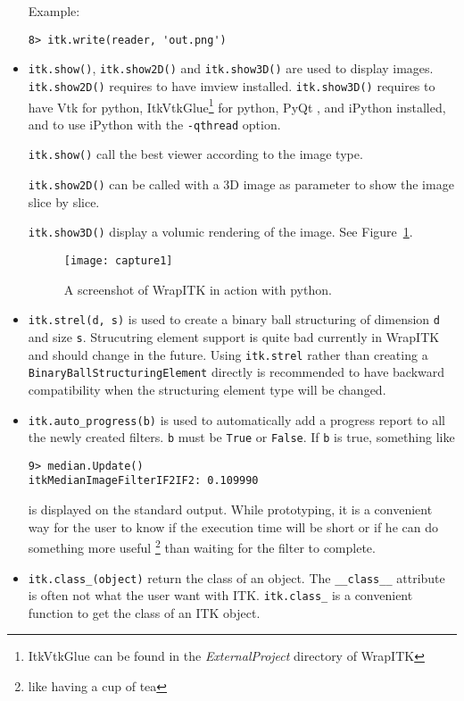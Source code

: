\documentclass{InsightArticle}
\begin{document}
\begin{itemize}
Example:
\begin{verbatim}
8> itk.write(reader, 'out.png')
\end{verbatim}

  \item \verb$itk.show()$, \verb$itk.show2D()$ and \verb$itk.show3D()$ are used to
display images. \verb$itk.show2D()$ requires to have imview \cite{ImviewWebSite} installed.
\verb$itk.show3D()$ requires to have Vtk for python, ItkVtkGlue\footnote{ItkVtkGlue can be found in
the {\em ExternalProject} directory of WrapITK} for python, PyQt \cite{PyQtWebSite}, and iPython
\cite{IPythonWebSite} installed, and to use iPython with the \verb$-qthread$ option.

\verb$itk.show()$ call the best viewer according to the image type.

\verb$itk.show2D()$
can be called with a 3D image as parameter to show the image slice by slice.

\verb$itk.show3D()$ display a volumic rendering of the image. See Figure~\ref{screenshot}.

\begin{figure}[htbp]
\centering
\texttt{[image: capture1]}
\caption{A screenshot of WrapITK in action with python.\label{screenshot}}
\end{figure}

  \item \verb$itk.strel(d, s)$ is used to create a binary ball structuring of dimension
\verb$d$ and size \verb$s$. Strucutring element support is quite bad currently in WrapITK
and should change in the future. Using \verb$itk.strel$ rather than creating a
\verb$BinaryBallStructuringElement$ directly is recommended to have backward compatibility
when the structuring element type will be changed.

  \item \verb$itk.auto_progress(b)$ is used to automatically add a progress report
to all the newly created filters. \verb$b$ must be \verb$True$ or \verb$False$. If
\verb$b$ is true, something like
\begin{verbatim}
9> median.Update()
itkMedianImageFilterIF2IF2: 0.109990
\end{verbatim}
is displayed on the standard output. 
While prototyping, it is a convenient way for the user to know if
the execution time will be short or if he can do something more useful
\footnote{like having a cup of tea} than waiting for the filter to complete.

  \item \verb$itk.class_(object)$ return the class of an object. The \verb$__class__$
attribute is often not what the user want with ITK. \verb$itk.class_$ is a convenient
function to get the class of an ITK object.


\end{itemize}
\end{document}
